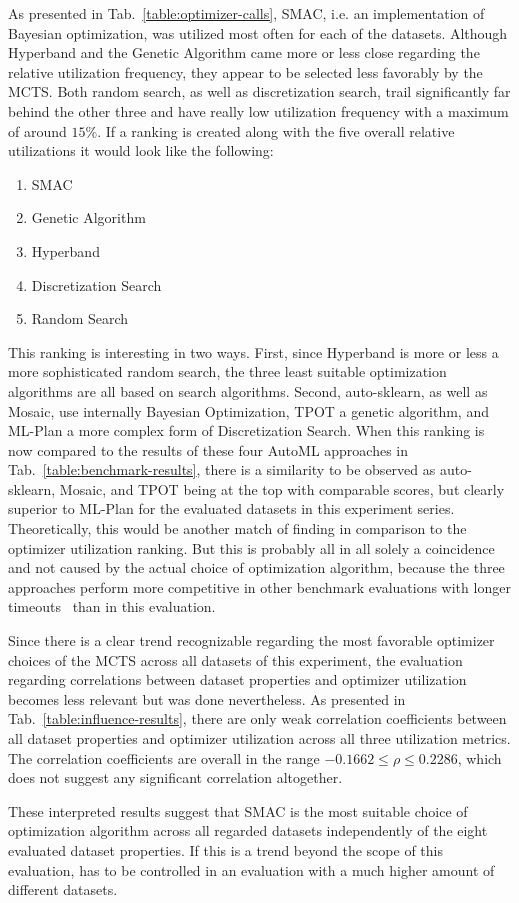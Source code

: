 As presented in Tab.~\ref{table:optimizer-calls}, SMAC, i.e. an implementation of Bayesian optimization, was utilized most often for each of the datasets.
Although Hyperband and the Genetic Algorithm came more or less close regarding the relative utilization frequency, they appear to be selected less favorably by the MCTS.
Both random search, as well as discretization search, trail significantly far behind the other three and have really low utilization frequency with a maximum of around $15\%$.\newline
If a ranking is created along with the five overall relative utilizations it would look like the following:
\begin{enumerate}
    \item SMAC
    \item Genetic Algorithm
    \item Hyperband
    \item Discretization Search
    \item Random Search
\end{enumerate}
This ranking is interesting in two ways.
First, since Hyperband is more or less a more sophisticated random search, the three least suitable optimization algorithms are all based on search algorithms.\newline
Second, auto-sklearn, as well as Mosaic, use internally Bayesian Optimization, TPOT a genetic algorithm, and ML-Plan a more complex form of Discretization Search.
When this ranking is now compared to the results of these four AutoML approaches in Tab.~\ref{table:benchmark-results}, there is a similarity to be observed as auto-sklearn, Mosaic, and TPOT being at the top with comparable scores, but clearly superior to ML-Plan for the evaluated datasets in this experiment series.
Theoretically, this would be another match of finding in comparison to the optimizer utilization ranking.
But this is probably all in all solely a coincidence and not caused by the actual choice of optimization algorithm, because the three approaches perform more competitive in other benchmark evaluations with longer timeouts~\cite{Mohr-ML-Plan} than in this evaluation.

Since there is a clear trend recognizable regarding the most favorable optimizer choices of the MCTS across all datasets of this experiment, the evaluation regarding correlations between dataset properties and optimizer utilization becomes less relevant but was done nevertheless.\newline
As presented in Tab.~\ref{table:influence-results}, there are only weak correlation coefficients between all dataset properties and optimizer utilization across all three utilization metrics.
The correlation coefficients are overall in the range $-0.1662 \leq \rho \leq 0.2286$, which does not suggest any significant correlation altogether.

These interpreted results suggest that SMAC is the most suitable choice of optimization algorithm across all regarded datasets independently of the eight evaluated dataset properties.
If this is a trend beyond the scope of this evaluation, has to be controlled in an evaluation with a much higher amount of different datasets.

